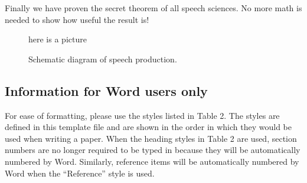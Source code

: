Finally we have proven the secret theorem of all speech sciences. No more math is needed to show how useful the result is!

\begin{figure}[t]
  \centering
  here is a picture

  \caption{Schematic diagram of speech production.}
  \label{fig:speech_production}
\end{figure}

\subsection{Information for Word users only}

For ease of formatting, please use the styles listed in Table 2. The styles are defined in this template file and are shown in the order in which they would be used when writing a paper. When the heading styles in Table 2 are used, section numbers are no longer required to be typed in because they will be automatically numbered by Word. Similarly, reference items will be automatically numbered by Word when the ``Reference'' style is used.

